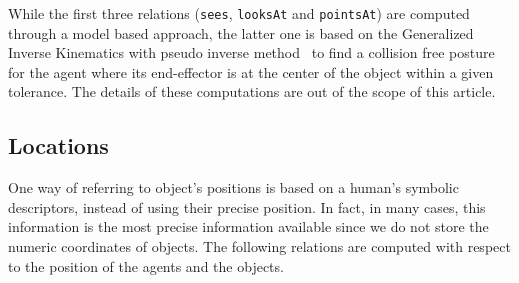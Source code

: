 \documentclass[twocolumn]{svjour3}
\newcommand{\concept}[1]{{\footnotesize \texttt{#1}}}
\begin{document}
While the first three relations (\concept{sees}, \concept{looksAt} and
\concept{pointsAt}) are computed through a model based approach, the latter one
is based on the Generalized Inverse Kinematics with pseudo inverse
method~\cite{Nakamura90,Baerlocher04} to find a collision free posture for the
agent where its end-effector is at the center of the object within a given
tolerance. The details of these computations are out of the scope of this
article.

\subsection{Locations}

One way of referring to object's
positions is based on a human's symbolic descriptors, instead of using their precise
position. In fact, in many cases, this information is the most precise information available
 since we do not store the numeric coordinates of objects. The
following relations are computed with respect to the position of the agents and
the objects.
\end{document}
